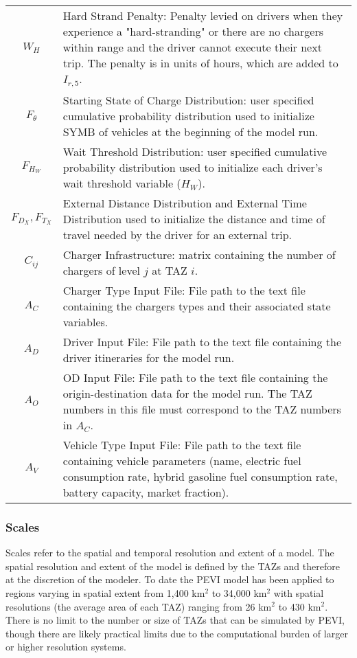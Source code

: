 \documentclass[journal]{IEEEtran}
\begin{document}
\begin{table}[!h]
\begin{tabular}{|cl|}
$W_H$ &	\parbox[t]{\colmargin}{ \raggedright Hard Strand Penalty:	Penalty levied on drivers when they experience a "hard-stranding" or there are no chargers within range and the driver cannot execute their next trip.  The penalty is in units of hours, which are added to $I_{r,5}$.}\\
$F_{\theta}$ &	\parbox[t]{\colmargin}{ \raggedright Starting State of Charge Distribution: user specified cumulative probability distribution used to initialize SYMB of vehicles at the beginning of the model run.}\\
$F_{H_W}$ &	\parbox[t]{\colmargin}{ \raggedright Wait Threshold Distribution: user specified cumulative probability distribution used to initialize each driver's wait threshold variable ($H_W$).}\\
$F_{D_X}, F_{T_X}$ &	\parbox[t]{\colmargin}{ \raggedright External Distance Distribution and External Time Distribution used to initialize the distance and time of travel needed by the driver for an external trip.}\\
$C_{ij}$ &	\parbox[t]{\colmargin}{ \raggedright Charger Infrastructure: matrix containing the number of chargers of level $j$ at TAZ $i$. }\\
$A_C$ &	\parbox[t]{\colmargin}{ \raggedright Charger Type Input File: File path to the text file containing the chargers types and their associated state variables.}\\
$A_D$ &	\parbox[t]{\colmargin}{ \raggedright Driver Input File:	File path to the text file containing the driver itineraries for the model run.}\\
$A_O$ &	\parbox[t]{\colmargin}{ \raggedright OD Input File: File path to the text file containing the origin-destination data for the model run.  The TAZ numbers in this file must correspond to the TAZ numbers in $A_C$.}\\
$A_V$ &	\parbox[t]{\colmargin}{ \raggedright Vehicle Type Input File: File path to the text file containing vehicle parameters (name, electric fuel consumption rate, hybrid gasoline fuel consumption rate, battery capacity, market fraction).}\\
\hline
\end{tabular}
\end{table}

\subsubsection{Scales}

Scales refer to the spatial and temporal resolution and extent of a model. The spatial resolution and extent of the model is defined by the TAZs and therefore at the discretion of the modeler.  To date the PEVI model has been applied to regions varying in spatial extent from 1,400 km$^2$ to 34,000 km$^2$ with spatial resolutions (the average area of each TAZ) ranging from 26 km$^2$ to 430 km$^2$.  There is no limit to the number or size of TAZs that can be simulated by PEVI, though there are likely practical limits due to the computational burden of larger or higher resolution systems.
\end{document}
